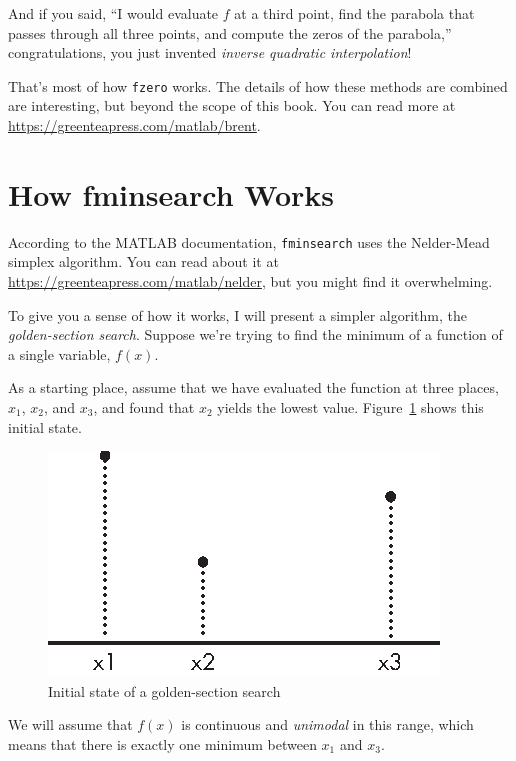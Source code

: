 And if you said, ``I would evaluate $f$ at a third point, find the
parabola that passes through all three points, and compute the zeros
of the parabola,'' congratulations, you just invented
\emph{inverse quadratic interpolation}!

That's most of how \lstinline{fzero} works.  The details of how these methods are combined are interesting, but beyond the scope of this book.  You can read more at \url{https://greenteapress.com/matlab/brent}.


\section{How fminsearch Works}
\label{howfminsearch}

According to the MATLAB documentation, \lstinline{fminsearch} uses the Nelder-Mead simplex algorithm.  You can read about it at \url{https://greenteapress.com/matlab/nelder}, but you might find it overwhelming.


To give you a sense of how it works, I will present a simpler algorithm, the \emph{golden-section search}.  Suppose we're trying to find the minimum of a function of a single variable, $f(x)$.

As a starting place, assume that we have evaluated the function at three places,
$x_1$, $x_2$, and $x_3$, and found that $x_2$ yields the lowest
value. Figure~\ref{fig:golden1} shows this initial state.

\begin{figure}[h]
\centerline{\includegraphics[scale=0.8]{images/figure15_04_new.eps}}
\caption{Initial state of a golden-section search}
\label{fig:golden1}
\end{figure}

We will assume that $f(x)$ is continuous and \emph{unimodal} in this range, which means that there is exactly one minimum between $x_1$ and $x_3$.

